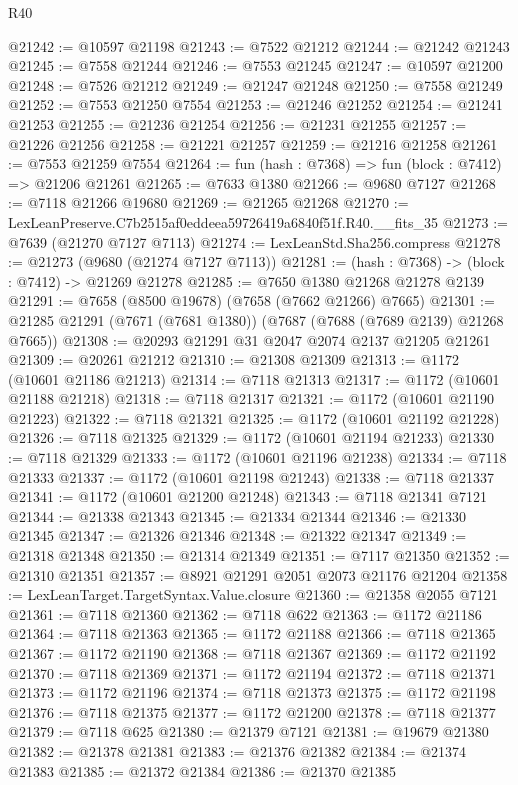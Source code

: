 \begin{lexlean}{R40}
\begin{coremodule}
@21242 := @10597 @21198
@21243 := @7522 @21212
@21244 := @21242 @21243
@21245 := @7558 @21244
@21246 := @7553 @21245
@21247 := @10597 @21200
@21248 := @7526 @21212
@21249 := @21247 @21248
@21250 := @7558 @21249
@21252 := @7553 @21250 @7554
@21253 := @21246 @21252
@21254 := @21241 @21253
@21255 := @21236 @21254
@21256 := @21231 @21255
@21257 := @21226 @21256
@21258 := @21221 @21257
@21259 := @21216 @21258
@21261 := @7553 @21259 @7554
@21264 := fun (hash : @7368) => fun (block : @7412) => @21206 @21261
@21265 := @7633 @1380
@21266 := @9680 @7127
@21268 := @7118 @21266 @19680
@21269 := @21265 @21268
@21270 := LexLeanPreserve.C7b2515af0eddeea59726419a6840f51f.R40.__fits_35
@21273 := @7639 (@21270 @7127 @7113)
@21274 := LexLeanStd.Sha256.compress
@21278 := @21273 (@9680 (@21274 @7127 @7113))
@21281 := (hash : @7368) -> (block : @7412) -> @21269 @21278
@21285 := @7650 @1380 @21268 @21278 @2139
@21291 := @7658 (@8500 @19678) (@7658 (@7662 @21266) @7665)
@21301 := @21285 @21291 (@7671 (@7681 @1380)) (@7687 (@7688 (@7689 @2139) @21268 @7665))
@21308 := @20293 @21291 @31 @2047 @2074 @2137 @21205 @21261
@21309 := @20261 @21212
@21310 := @21308 @21309
@21313 := @1172 (@10601 @21186 @21213)
@21314 := @7118 @21313
@21317 := @1172 (@10601 @21188 @21218)
@21318 := @7118 @21317
@21321 := @1172 (@10601 @21190 @21223)
@21322 := @7118 @21321
@21325 := @1172 (@10601 @21192 @21228)
@21326 := @7118 @21325
@21329 := @1172 (@10601 @21194 @21233)
@21330 := @7118 @21329
@21333 := @1172 (@10601 @21196 @21238)
@21334 := @7118 @21333
@21337 := @1172 (@10601 @21198 @21243)
@21338 := @7118 @21337
@21341 := @1172 (@10601 @21200 @21248)
@21343 := @7118 @21341 @7121
@21344 := @21338 @21343
@21345 := @21334 @21344
@21346 := @21330 @21345
@21347 := @21326 @21346
@21348 := @21322 @21347
@21349 := @21318 @21348
@21350 := @21314 @21349
@21351 := @7117 @21350
@21352 := @21310 @21351
@21357 := @8921 @21291 @2051 @2073 @21176 @21204
@21358 := LexLeanTarget.TargetSyntax.Value.closure
@21360 := @21358 @2055 @7121
@21361 := @7118 @21360
@21362 := @7118 @622
@21363 := @1172 @21186
@21364 := @7118 @21363
@21365 := @1172 @21188
@21366 := @7118 @21365
@21367 := @1172 @21190
@21368 := @7118 @21367
@21369 := @1172 @21192
@21370 := @7118 @21369
@21371 := @1172 @21194
@21372 := @7118 @21371
@21373 := @1172 @21196
@21374 := @7118 @21373
@21375 := @1172 @21198
@21376 := @7118 @21375
@21377 := @1172 @21200
@21378 := @7118 @21377
@21379 := @7118 @625
@21380 := @21379 @7121
@21381 := @19679 @21380
@21382 := @21378 @21381
@21383 := @21376 @21382
@21384 := @21374 @21383
@21385 := @21372 @21384
@21386 := @21370 @21385

\end{coremodule}
\end{lexlean}
